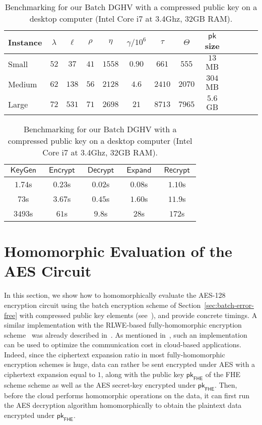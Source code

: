 \documentclass{llncs}
\DeclareMathOperator{\KeyGen}{\ensuremath{\mathsf{KeyGen}}}
\DeclareMathOperator{\Expand}{\ensuremath{\mathsf{Expand}}}
\DeclareMathOperator{\Encrypt}{\ensuremath{\mathsf{Encrypt}}}
\DeclareMathOperator{\Decrypt}{\ensuremath{\mathsf{Decrypt}}}
\DeclareMathOperator{\Recrypt}{\ensuremath{\mathsf{Recrypt}}}
\DeclareMathOperator{\Mult}{\ensuremath{\mathsf{Mult}}}
\newcommand*{\pk}{\ensuremath{\mathsf{pk}}}
\newcommand*{\FHE}{\ensuremath{\mathsf{FHE}}}
\begin{document}
\begin{table}[h]\scriptsize\centering
\begin{tabular}{|l|c|c||c|c|c|c|c|c|c|c|c||r|}
\hline 
\textbf{Instance}&$\lambda$&$\ell$&$\rho$&$\eta$&$\gamma/ 10^{6}$&$\tau$&$\Theta$&$\pk$ size\\
\hline
\hline
Small&$52$&$37$&$41$&$1558$&$0.90$&$661$&$555$&$13$ MB\\\hline
Medium&$62$&$138$&$56$&$2128$&$4.6$&$2410$&$2070$&$304$ MB\\\hline
Large&$72$&$531$&$71$&$2698$&$21$&$8713$&$7965$&$5.6$ GB\\\hline
\end{tabular}\begin{tabular}{||c|c|c|c|c|}
\hline 
$\KeyGen$&$\Encrypt$&$\Decrypt$&
$\Expand$ & $\Recrypt$\\
\hline
\hline
$1.74$s&$0.23$s&$0.02$s&
$0.08$s&$1.10$s\\\hline
$73$s&$3.67$s&$0.45$s&
$1.60$s&$11.9$s\\\hline
$3493$s&$61$s&$9.8$s&
$28$s&$172$s\\\hline
\end{tabular}
\smallskip
\label{t:concparams}
\caption{Benchmarking for our Batch DGHV with a compressed public key
  on a desktop computer (Intel Core i7 at 3.4Ghz, 32GB RAM).}
\end{table}


\section{Homomorphic Evaluation of the AES Circuit}
\label{sec:HAES}

In this section, we show how to homomorphically evaluate the AES-128
encryption circuit using the batch encryption scheme of Section~\ref{sec:batch-error-free} with compressed public key elements (see~\cite{CLT2013a}), and provide
concrete timings. A similar
implementation with
 the RLWE-based 
fully-homomorphic encryption scheme~\cite{BV2011a,BV2011b,GHS2012a}
was already described in~\cite{GHS2012c}. 
As mentioned 
in~\cite{SV2011,NLV2011,GHS2012c}, such an implementation can be used to
optimize the communication cost in cloud-based
applications. Indeed, since the ciphertext expansion ratio in most
fully-homomorphic encryption schemes is huge, data can rather be sent
encrypted under AES with a ciphertext expansion equal to $1$, along
with the public key $\pk_{\FHE}$ of the FHE scheme scheme as well as
the AES secret-key 
encrypted under $\pk_{\FHE}$. Then, before the cloud performs homomorphic operations
on the data, it can first run the AES decryption algorithm
homomorphically to obtain the plaintext data encrypted under
$\pk_{\FHE}$.
\end{document}
